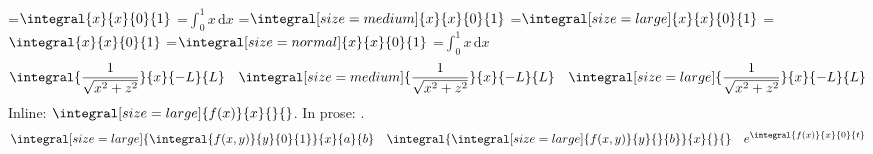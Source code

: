 \newbox\normalintegralbox
\newbox\mediumintegralbox
\newbox\largeintegralbox
\newbox{}
\setbox\normalintegralbox=\hbox{$\displaystyle\integral{x}{x}{0}{1}$}
\setbox{}=\hbox{$\displaystyle\int_0^1\!x\,\mathrm{d}x$}
\newcommand{\assertintegralsame}{%
  \ifdim\wd\normalintegralbox=\wd\referenceintegralbox\else\errmessage{Integral width changed}\fi
  \ifdim\ht\normalintegralbox=\ht\referenceintegralbox\else\errmessage{Integral height changed}\fi
  \ifdim\dp\normalintegralbox=\dp\referenceintegralbox\else\errmessage{Integral depth changed}\fi}
\assertintegralsame
\setbox\mediumintegralbox=\hbox{$\displaystyle\integral[size=medium]{x}{x}{0}{1}$}
\setbox\largeintegralbox=\hbox{$\displaystyle\integral[size=large]{x}{x}{0}{1}$}
\ifdim\ht\mediumintegralbox>\ht\normalintegralbox\else\errmessage{Medium integral did not grow}\fi
\ifdim\ht\largeintegralbox>\ht\mediumintegralbox\else\errmessage{Large integral did not grow}\fi
\setbox\normalintegralbox=\hbox{$\displaystyle\integral{x}{x}{0}{1}$}
\assertintegralsame
\setbox\normalintegralbox=\hbox{$\integral[size=normal]{x}{x}{0}{1}$}
\setbox{}=\hbox{$\int_0^1\!x\,\mathrm{d}x$}
\assertintegralsame
\[
 \integral{\frac{1}{\sqrt{x^2+z^2}}}{x}{-L}{L}\quad
 \integral[size=medium]{\frac{1}{\sqrt{x^2+z^2}}}{x}{-L}{L}\quad
 \integral[size=large]{\frac{1}{\sqrt{x^2+z^2}}}{x}{-L}{L}
\]
Inline: $\integral[size=large]{f(x)}{x}{}{}$.
In prose: .
\[
 \integral[size=large]{\integral{f(x,y)}{y}{0}{1}}{x}{a}{b}
 \quad \integral{\integral[size=large]{f(x,y)}{y}{}{b}}{x}{}{}
 \quad e^{\integral{f(x)}{x}{0}{t}}
\]
